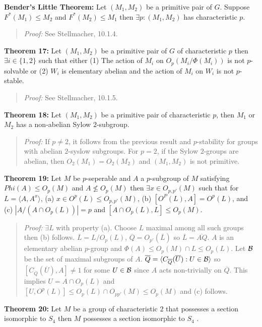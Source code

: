 {\bf Bender's Little Theorem:}
Let $(M_1, M_2)$ be a primitive pair of $G$.  Suppose $F^*(M_1) \le M_2$ and
$F^*(M_2) \le M_1$ then $\exists p: (M_1, M_2)$ has characteristic $p$.
\begin{quote}
\emph{Proof:}  See Stellmacher, 10.1.4.
\end{quote}
{\bf Theorem 17:}
Let $(M_1, M_2)$ be a primitive pair of $G$ of characteristic $p$ then $\exists i \in \{1 , 2 \}$
such that either (1) The action of $M_i$ on $O_p(M_i/ \Phi(M_i))$ is not $p$-solvable or
(2) $W_i$ is elementary abelian and the action of $M_i$ on $W_i$ is not $p$-stable.
\begin{quote}
\emph{Proof:}  See Stellmacher, 10.1.5.
\end{quote}
{\bf Theorem 18:}
Let $(M_1, M_2)$ be a primitive pair of characteristic $p$, then $M_1$ or
$M_2$ has a non-abelian Sylow $2$-subgroup.
\begin{quote}
\emph{Proof:}  If $p \neq 2$, it follows from the previous result and $p$-stability for groups with abelian $2$-syslow subgroups.
For $p= 2$, if the Sylow $2$-groups are abelian, then $O_2(M_1)= O_2(M_2)$ and $(M_1, M_2)$ is not primitive.
\end{quote}
{\bf Theorem 19:}
Let $M$ be $p$-seperable and $A$ a $p$-subgroup of $M$ satisfying
$Phi(A) \leq O_p(M)$ and $A \nleq O_p(M)$ then $\exists x \in O_{p,p'}(M)$
such that for $L= \langle A, A^x \rangle$, (a) $x \in O^p(L) \leq O_{p,p'}(M)$,
(b) $[O^P(L),A]= O^p(L)$, and (c) $|A/(A \cap O_p(L))|=p$ and $[A \cap O_p(L), L] \leq O_p(M)$.
\begin{quote}
\emph{Proof:}  $\exists L$ with property (a).  Choose $L$ maximal among all such groups then (b) follows.
${\overline L}= L/O_p(L)$, ${\overline Q}= O_{p'}({\overline L})$ so ${\overline L} = {\overline {AQ}}$.
$A$ is an elementary abelian $p$-group and
$\Phi(A) \leq O_p(M) \cap L \leq O_p(L)$.  Let ${\cal B}$ be the set of maximal subgroups of $A$.
${\overline Q}=  \langle C_{\overline Q}({\overline U}): U \in {\cal B} \rangle$ so
$[C_{\overline Q}({\overline U}), A] \neq 1$ for some $U \in {\cal B}$ since $A$ acts non-trivially
on ${\overline Q}$.  This implies $U= A \cap O_p(L)$ and
$[U, O^p(L)] \leq O_p(L) \cap O_{pp'}(M) \leq O_p(M)$ and (c) follows.
\end{quote}
{\bf Theorem 20:}
Let $M$ be a group of characteristic $2$ that possesses a section isomorphic to $S_4$  then $M$
possesses a section isomorphic to $S_4$ .
